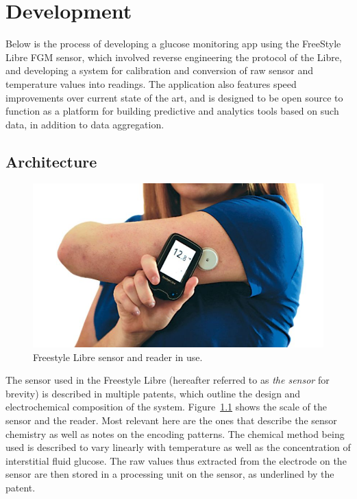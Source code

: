 \chapter{Development}

Below is the process of developing a glucose monitoring app using the FreeStyle Libre FGM sensor, which involved reverse engineering the protocol of the Libre, and developing a system for calibration and conversion of raw sensor and temperature values into readings. The application also features speed improvements over current state of the art, and is designed to be open source to function as a platform for building predictive and analytics tools based on such data, in addition to data aggregation.

\section{Architecture}

\begin{figure}[ht]
\centering\includegraphics[width=0.4\linewidth]{images/libre1}
\caption{Freestyle Libre sensor and reader in use\cite{noauthor_how_2017}.}
\label{fig:libre1}
\end{figure}

The sensor used in the Freestyle Libre (hereafter referred to as \textit{the sensor} for brevity) is described in multiple patents\cite{noauthor_patents_nodate}, which outline the design and electrochemical composition of the system. Figure~\ref{fig:libre1} shows the scale of the sensor and the reader. Most relevant here are the ones that describe the sensor chemistry as well as notes on the encoding patterns. The chemical method being used\cite{say_electrochemical_2000} is described to vary linearly with temperature as well as the concentration of interstitial fluid glucose. The raw values thus extracted from the electrode on the sensor are then stored in a processing unit on the sensor, as underlined by the patent. 


